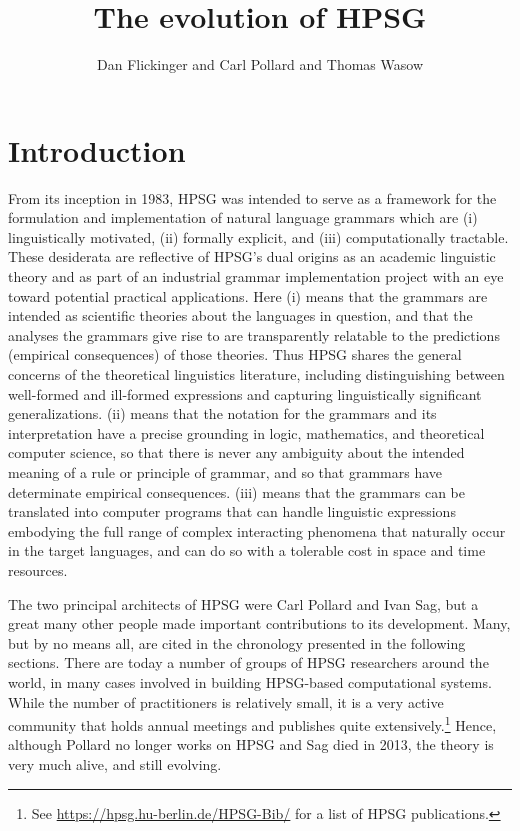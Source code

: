 \documentclass[output=paper,biblatex,babelshorthands,newtxmath,draftmode,colorlinks,citecolor=brown]{langscibook}
\title{The evolution of HPSG}
\author{Dan Flickinger\orcid{0000-0001-7959-999X}\affiliation{Stanford University} and Carl Pollard\affiliation{Ohio State
    Universitiy} and Thomas Wasow\orcid{0000-0001-8141-8051}\affiliation{Stanford University}}
\begin{document}
\maketitle
\label{chap-evolution}


\section{Introduction} 

From its inception in 1983, HPSG was intended to serve as a framework for the formulation and implementation of natural language grammars which are (i) linguistically motivated, (ii) formally explicit, and (iii) computationally tractable. These desiderata are reflective of HPSG's dual origins as an academic linguistic theory and as part of an industrial grammar implementation project with an eye toward potential practical applications. Here (i) means that the grammars are intended as scientific theories about the languages in question, and that the analyses the grammars give rise to are transparently relatable to the predictions (empirical consequences) of those theories. Thus HPSG shares the general concerns of the theoretical linguistics literature, including distinguishing between well-formed and ill-formed expressions and capturing linguistically significant generalizations.  (ii) means that the notation for the grammars and its interpretation have a precise grounding in logic, mathematics, and theoretical computer science, so that there is never any ambiguity about the intended meaning of a rule or principle of grammar, and so that grammars have determinate empirical consequences. (iii) means that the grammars can be translated into computer programs that can handle linguistic expressions embodying the full range of complex interacting phenomena that naturally occur in the target languages, and can do so with a tolerable cost in space and time resources.

The two principal architects of HPSG were Carl Pollard and Ivan
Sag, but a great many other people made important contributions to its
development.  Many, but by no means all, are cited in the chronology presented in the following
sections.  There are today a number of groups of HPSG researchers around the world, in many cases
involved in building HPSG-based computational systems.  While the number of practitioners is
relatively small, it is a very active community that holds annual meetings and publishes quite
extensively.\footnote{See \url{https://hpsg.hu-berlin.de/HPSG-Bib/} for a list of HPSG
    publications.} Hence, although Pollard no longer works on HPSG and Sag died in 2013, the theory
is very much alive, and still evolving.
\end{document}
